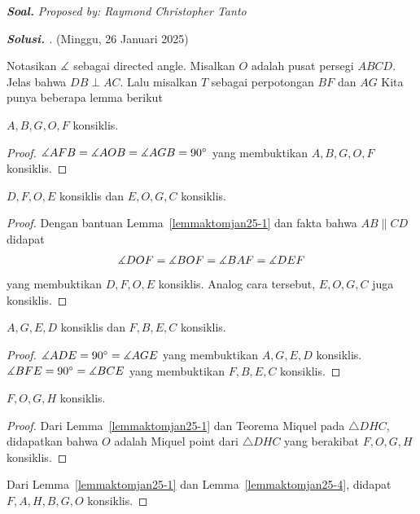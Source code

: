 \textbf{\textit{Soal. }} 
\textit{Proposed by: Raymond Christopher Tanto}
\begin{proof}[\textbf{Solusi. }] (Minggu, 26 Januari 2025) 
    
    Notasikan $\measuredangle$ sebagai directed angle.
    Misalkan $O$ adalah pusat persegi $ABCD$. Jelas bahwa $DB \perp AC$. Lalu misalkan $T$ sebagai perpotongan $BF$ dan $AG$ Kita punya beberapa lemma berikut
    \begin{lemmarev}\label{lemmaktomjan25-1}
        $A,B,G,O,F$ konsiklis.
        \begin{proof}
            $\measuredangle AFB = \measuredangle AOB = \measuredangle AGB = 90^\circ$ yang membuktikan $A,B,G,O,F$ konsiklis.
        \end{proof}
    \end{lemmarev}
    \begin{lemmarev}\label{lemmaktomjan25-2}
        $D,F,O,E$ konsiklis dan $E, O, G, C$ konsiklis.
        \begin{proof}
            Dengan bantuan Lemma~\ref{lemmaktomjan25-1} dan fakta bahwa $AB \parallel CD$ didapat
            \begin{align*}
                \measuredangle DOF = \measuredangle BOF = \measuredangle BAF = \measuredangle DEF
            \end{align*}
            yang membuktikan $D,F,O,E$ konsiklis. Analog cara tersebut, $E, O, G, C$ juga konsiklis.
        \end{proof}
    \end{lemmarev}
    \begin{lemmarev}\label{lemmaktomjan25-3}
        $A,G,E,D$ konsiklis dan $F,B,E,C$ konsiklis.
        \begin{proof}
            $\measuredangle ADE = 90^\circ = \measuredangle AGE$ yang membuktikan $A,G,E,D$ konsiklis. $\measuredangle BFE = 90^\circ = \measuredangle BCE$ yang membuktikan $F,B,E,C$ konsiklis.
        \end{proof}
    \end{lemmarev}
    \begin{lemmarev}\label{lemmaktomjan25-4}
        $F,O,G,H$ konsiklis.
        \begin{proof}
            Dari Lemma~\ref{lemmaktomjan25-1} dan Teorema Miquel pada $\triangle DHC$, didapatkan bahwa $O$ adalah Miquel point dari $\triangle DHC$ yang berakibat $F,O,G,H$ konsiklis.
        \end{proof}
    \end{lemmarev}
    Dari Lemma~\ref{lemmaktomjan25-1} dan Lemma~\ref{lemmaktomjan25-4}, didapat $F,A,H,B,G,O$ konsiklis.


\end{proof}
